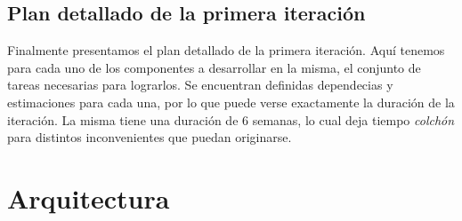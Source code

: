 \documentclass[10pt, a4paper]{article}
\begin{document}



\subsection{Plan detallado de la primera iteración}

Finalmente presentamos el plan detallado de la primera iteración. Aquí tenemos para cada uno de los componentes a desarrollar en la misma, el conjunto de tareas necesarias para lograrlos. Se encuentran definidas dependecias y estimaciones para cada una, por lo que puede verse exactamente la duración de la iteración. La misma tiene una duración de 6 semanas, lo cual deja tiempo \emph{colchón} para distintos inconvenientes que puedan originarse.



\section{Arquitectura}


\end{document}
